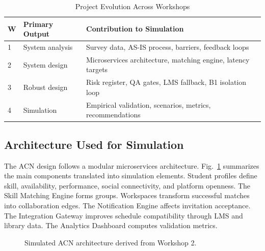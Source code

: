 \documentclass[conference]{IEEEtran}
\begin{document}
\begin{table}[htbp]
\caption{Project Evolution Across Workshops}
\label{tab:evolution}
\centering
\begin{tabular}{p{0.65cm} p{2.2cm} p{4.3cm}}
\toprule
\textbf{W} & \textbf{Primary Output} & \textbf{Contribution to Simulation} \\
\midrule
1 & System analysis & Survey data, AS-IS process, barriers, feedback loops \\
2 & System design & Microservices architecture, matching engine, latency targets \\
3 & Robust design & Risk register, QA gates, LMS fallback, B1 isolation loop \\
4 & Simulation & Empirical validation, scenarios, metrics, recommendations \\
\bottomrule
\end{tabular}
\end{table}

\subsection{Architecture Used for Simulation}

The ACN design follows a modular microservices architecture. Fig.~\ref{fig:architecture} summarizes the main components translated into simulation elements. Student profiles define skill, availability, performance, social connectivity, and platform openness. The Skill Matching Engine forms groups. Workspaces transform successful matches into collaboration edges. The Notification Engine affects invitation acceptance. The Integration Gateway improves schedule compatibility through LMS and library data. The Analytics Dashboard computes validation metrics.

\begin{figure}[htbp]
\centering
{}
\caption{Simulated ACN architecture derived from Workshop 2.}
\label{fig:architecture}
\end{figure}
\end{document}
